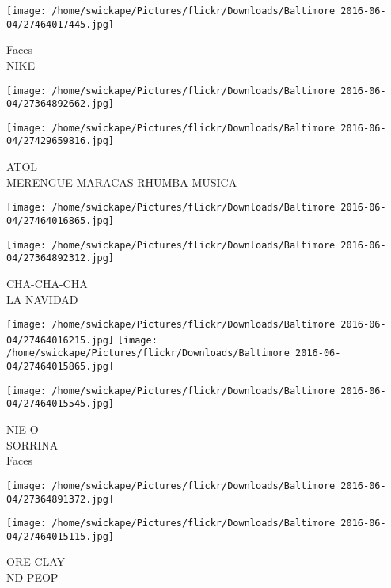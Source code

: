 \documentclass[10pt,letterpaper]{article}
\begin{document}
\vspace{0.25in}
\texttt{[image: /home/swickape/Pictures/flickr/Downloads/Baltimore 2016-06-04/27464017445.jpg]}

Faces\\
NIKE\\
\pagebreak

\texttt{[image: /home/swickape/Pictures/flickr/Downloads/Baltimore 2016-06-04/27364892662.jpg]}

\vspace{0.25in}
\texttt{[image: /home/swickape/Pictures/flickr/Downloads/Baltimore 2016-06-04/27429659816.jpg]}

ATOL\\
MERENGUE MARACAS RHUMBA MUSICA\\
\pagebreak

\texttt{[image: /home/swickape/Pictures/flickr/Downloads/Baltimore 2016-06-04/27464016865.jpg]}

\vspace{0.25in}
\texttt{[image: /home/swickape/Pictures/flickr/Downloads/Baltimore 2016-06-04/27364892312.jpg]}

CHA{-}CHA{-}CHA\\
LA NAVIDAD\\
\pagebreak

\texttt{[image: /home/swickape/Pictures/flickr/Downloads/Baltimore 2016-06-04/27464016215.jpg]}
\texttt{[image: /home/swickape/Pictures/flickr/Downloads/Baltimore 2016-06-04/27464015865.jpg]}

\vspace{0.25in}
\texttt{[image: /home/swickape/Pictures/flickr/Downloads/Baltimore 2016-06-04/27464015545.jpg]}

NIE O\\
SORRINA\\
Faces\\
\pagebreak

\texttt{[image: /home/swickape/Pictures/flickr/Downloads/Baltimore 2016-06-04/27364891372.jpg]}

\vspace{0.25in}
\texttt{[image: /home/swickape/Pictures/flickr/Downloads/Baltimore 2016-06-04/27464015115.jpg]}

ORE CLAY\\
ND PEOP\\
\pagebreak
\end{document}
